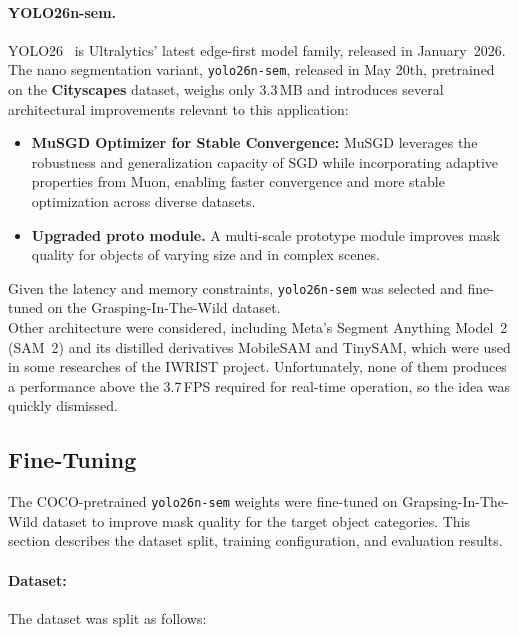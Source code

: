 \documentclass{article}
\begin{document}
\paragraph{YOLO26n-sem.}
YOLO26~ is Ultralytics' \cite{ultralytics_yolo26} latest edge-first model family, released in
January~2026. The nano segmentation variant, \texttt{yolo26n-sem}, released in May 20th, pretrained on the \textbf{Cityscapes} dataset, weighs only 3.3\,MB
and introduces several architectural improvements relevant to this application:

\begin{itemize}
    \item \textbf{MuSGD Optimizer for Stable Convergence:} MuSGD leverages the robustness and generalization capacity
    of SGD while incorporating adaptive properties from Muon, enabling faster convergence and more stable optimization across diverse datasets.
    
    \item \textbf{Upgraded proto module.} A multi-scale prototype module improves mask quality for objects of varying size and in complex scenes.
\end{itemize}

\noindent Given the latency and memory constraints, \texttt{yolo26n-sem} was selected
and fine-tuned on the Grasping-In-The-Wild dataset.\\

Other architecture were considered, including Meta's Segment Anything Model~2 (SAM~2) and its distilled derivatives
MobileSAM and TinySAM, which were used in some researches of the IWRIST project. Unfortunately, none of them produces a performance above the 3.7\,FPS required for real-time operation, so the idea was quickly dismissed.

\subsection{Fine-Tuning}
The COCO-pretrained \texttt{yolo26n-sem} weights were fine-tuned on Grapsing-In-The-Wild dataset to improve mask quality for the target object categories. This section describes the
dataset split, training configuration, and evaluation results.\\

\paragraph{Dataset:}
The dataset was split as follows:
\end{document}
